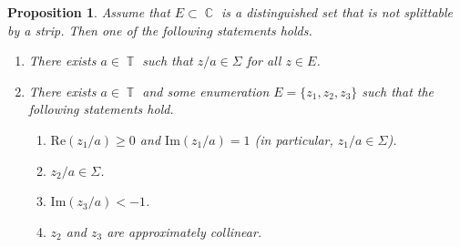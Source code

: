 \documentclass{amsart}
\numberwithin{equation}{section}
\newtheorem{proposition}[theorem]{Proposition}
\theoremstyle{definition}
\theoremstyle{remark}
\DeclareMathOperator{\CC}{\mathbb C}
\DeclareMathOperator{\TT}{\mathbb T}
\begin{document}
	\begin{proposition}\label{propIfSharpNotAsteriskThenCases}
		Assume that $E \subset \CC$ is a distinguished set that is not splittable by a strip. Then one of the following statements holds.
		\begin{enumerate}[label=(\roman*)]
			\item\label{casei} There exists $a \in \TT$ such that $z/a \in \Sigma$ for all $z \in E$.
			\item\label{caseii} There exists $a\in \TT$ and some enumeration $E = \{z_1, z_2, z_3\}$ such that the following statements hold.
			\begin{enumerate}[label=(\Roman*)]
				\item\label{I} $\mathrm{Re}(z_1/a) \ge 0$ and $\mathrm{Im}(z_1/a) = 1$ (in particular, $z_1/a \in \Sigma$).
				\item\label{II} $z_2 /a \in \Sigma$.
				\item\label{III} $\mathrm{Im}(z_3/a) < -1$.
				\item\label{IV} $z_2$ and $z_3$ are approximately collinear.
			\end{enumerate}
		\end{enumerate}
	\end{proposition}
\end{document}
